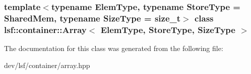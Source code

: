 \subsubsection*{template$<$typename ElemType, typename StoreType = SharedMem, typename SizeType = size\_\-t$>$ class lsf::container::Array$<$ ElemType, StoreType, SizeType $>$}



The documentation for this class was generated from the following file:\begin{DoxyCompactItemize}
\item 
dev/lsf/container/array.hpp\end{DoxyCompactItemize}
